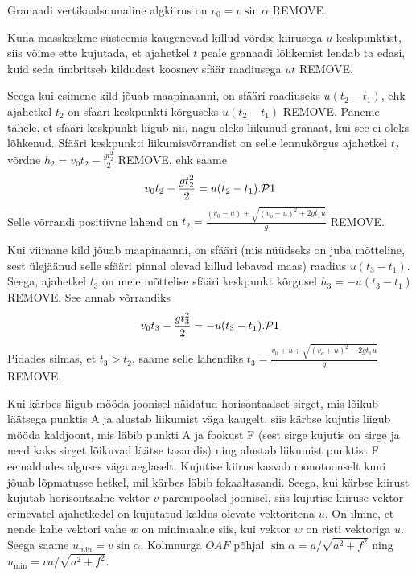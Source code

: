 \documentclass[10pt]{article}
\newcommand{\pp}[1]{REMOVE}
\begin{document}
\setAuthor{}

\solu
Granaadi vertikaalsuunaline algkiirus on $v_0=v\sin\alpha$ \pp{1}.

Kuna masskeskme süsteemis kaugenevad killud võrdse kiirusega $u$ keskpunktist, siis võime ette kujutada, et ajahetkel $t$ peale granaadi lõhkemist lendab ta edasi, kuid seda ümbritseb kildudest koosnev sfäär raadiusega $ut$ \pp{2}.

Seega kui esimene kild jõuab maapinaanni, on sfääri raadiuseks $u(t_2-t_1)$, ehk ajahetkel $t_2$ on sfääri keskpunkti kõrguseks $u(t_2-t_1)$ \pp{2}. Paneme tähele, et sfääri keskpunkt liigub nii, nagu oleks liikunud granaat, kui see ei oleks lõhkenud. Sfääri keskpunkti liikumisvõrrandist on selle lennukõrgus ajahetkel $t_2$ võrdne $h_2=v_0t_2-\frac{gt_2^2}{2}$ \pp{1}, ehk saame
$$
v_0t_2-\frac{gt_2^2}{2}=u(t_2-t_1). \pv1
$$
Selle võrrandi positiivne lahend on $t_2=\frac{(v_0-u)+\sqrt{(v_o-u)^2+2gt_1u}}{g}$ \pp{1}.

Kui viimane kild jõuab maapinaanni, on sfääri (mis nüüdseks on juba mõtteline, sest ülejäänud selle sfääri pinnal olevad killud lebavad maas) raadius $u(t_3-t_1)$. Seega, ajahetkel $t_3$ on meie mõttelise sfääri keskpunkt kõrgusel $h_3=-u(t_3-t_1)$ \pp{2}. See annab võrrandiks
$$
v_0t_3-\frac{gt_3^2}{2}=-u(t_3-t_1). \pv1	
$$
Pidades silmas, et $t_3>t_2$, saame selle lahendiks $t_3=\frac{v_0+u+\sqrt{(v_o+u)^2-2gt_1u}}{g}$ \pp{1}.
\probend
\bigskip

\setAuthor{}

\solu
Kui kärbes liigub mööda joonisel näidatud horisontaalset sirget, mis lõikub läätsega punktis A ja alustab liikumist väga kaugelt, siis kärbse kujutis liigub mööda kaldjoont, mis läbib punkti A ja fookust F (sest sirge kujutis on sirge ja need kaks sirget lõikuvad läätse tasandis) ning alustab liikumist punktist F eemaldudes alguses väga aeglaselt. Kujutise kiirus kasvab monotoonselt kuni jõuab lõpmatusse hetkel, mil kärbes läbib fokaaltasandi. Seega, kui kärbse kiirust kujutab horisontaalne vektor $v$ parempoolsel joonisel, siis kujutise kiiruse vektor erinevatel ajahetkedel on kujutatud kaldus olevate vektoritena $u$. On ilmne, et nende kahe vektori vahe $w$ on minimaalne siis, kui vektor $w$ on risti vektoriga $u$. Seega saame $u_{\min}=v\sin\alpha$. Kolmnurga $OAF$ põhjal $\sin\alpha=a/\sqrt{a^2+f^2}$ ning $u_{\min}=va/\sqrt{a^2+f^2}$.\\
\end{document}
